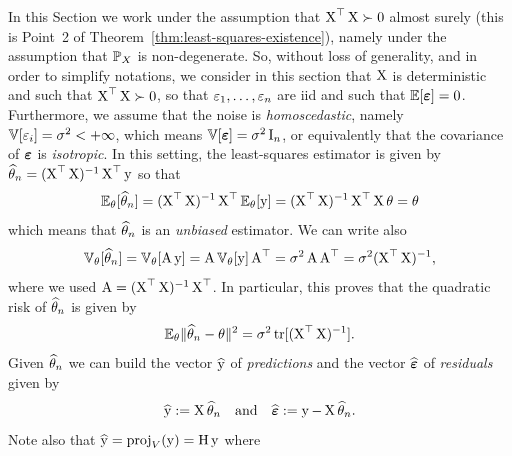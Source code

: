 In this Section we work under the assumption that $\bX^\top \bX \succ 0$ almost surely (this is Point~2 of Theorem~\ref{thm:least-squares-existence}), namely under the assumption that $\P_X$ is non-degenerate.
So, without loss of generality, and in order to simplify notations, we consider in this section that $\bX$ is deterministic%
and such that $\bX^\top \bX \succ 0$, so that $\eps_1, \ldots, \eps_n$ are iid and such that $\E[\beps] = 0$.
Furthermore, we assume that the noise is \emph{homoscedastic}, namely $\var[\eps_i] = \sigma^2 < +\infty$, which means $\var[\beps] = \sigma^2 \bI_n$, or equivalently that the covariance of $\beps$ is \emph{isotropic}.
In this setting, the least-squares estimator is given by $\wh \theta_n = (\bX^\top \bX)^{-1} \bX^\top \by$ so that
\begin{equation}
	\label{eq:mean-ols}
	\E_\theta[\wh \theta_n] = (\bX^\top \bX)^{-1} \bX^\top \E_\theta[\by] = (\bX^\top \bX)^{-1} \bX^\top \bX \theta = \theta
\end{equation}
which means that $\wh \theta_n$ is an \emph{unbiased} estimator. We can write also
\begin{equation}
	\label{eq:var-ols}
	\var_\theta[\wh \theta_n] = \var_\theta[ \bA \by] = \bA \var_\theta[\by] \bA^\top = \sigma^2 \bA \bA^\top = \sigma^2 (\bX^\top \bX)^{-1},
\end{equation}
%
where we used $\bA = (\bX^\top \bX)^{-1} \bX^\top$.
In particular, this proves that the quadratic risk of $\wh \theta_n$ is given by
\begin{equation*}
	\E_\theta \norm{\wh \theta_n - \theta}^2 = \sigma^2 \tr [(\bX^\top \bX)^{-1}].
\end{equation*}
%
Given $\wh \theta_n$ we can build the vector $\wh \by$ of \emph{predictions} and the vector $\wh \beps$ of \emph{residuals} given by
\begin{equation*}
	\wh \by := \bX \wh \theta_n \quad \text{and} \quad \wh \beps := \by - \bX \wh \theta_n.
\end{equation*}
Note also that $\wh \by = \proj_V(\by) = \bH \by$ where
